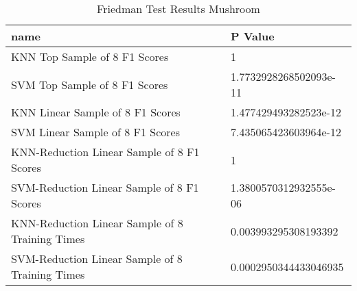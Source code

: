 \begin{table}[!htbp]
\centering
\caption{Friedman Test Results Mushroom}
\label{tab:friedman_test_results_mushroom}
\begin{tabular}{ll}
\toprule
name & P Value \\
\midrule
KNN Top Sample of 8 F1 Scores & 1 \\
SVM Top Sample of 8 F1 Scores & 1.7732928268502093e-11 \\
KNN Linear Sample of 8 F1 Scores & 1.477429493282523e-12 \\
SVM Linear Sample of 8 F1 Scores & 7.435065423603964e-12 \\
KNN-Reduction Linear Sample of 8 F1 Scores & 1 \\
SVM-Reduction Linear Sample of 8 F1 Scores & 1.3800570312932555e-06 \\
KNN-Reduction Linear Sample of 8 Training Times & 0.003993295308193392 \\
SVM-Reduction Linear Sample of 8 Training Times & 0.0002950344433046935 \\
\bottomrule
\end{tabular}
\end{table}
